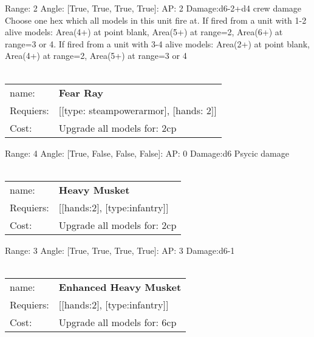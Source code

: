 Range: 2  Angle: [True, True, True, True]: AP: 2 Damage:d6-2+d4 crew damage \\
Choose one hex which all models in this unit fire at. If fired from a unit with 1-2 alive models: Area(4+) at point blank, Area(5+) at range=2, Area(6+) at range=3 or 4. If fired from a unit with 3-4 alive models: Area(2+) at point blank, Area(4+) at range=2, Area(5+) at range=3 or 4\\ 








\ \\
\begin{tabular}{ll}
name: & {\bf Fear Ray } \\
Requiers: & [[type: steampowerarmor], [hands: 2]] \\
Cost: & Upgrade all models for: 2cp \\
\end{tabular}



Range: 4  Angle: [True, False, False, False]: AP: 0 Damage:d6 Psycic damage \\








\ \\
\begin{tabular}{ll}
name: & {\bf Heavy Musket } \\
Requiers: & [[hands:2], [type:infantry]] \\
Cost: & Upgrade all models for: 2cp \\
\end{tabular}



Range: 3  Angle: [True, True, True, True]: AP: 3 Damage:d6-1 \\








\ \\
\begin{tabular}{ll}
name: & {\bf Enhanced Heavy Musket } \\
Requiers: & [[hands:2], [type:infantry]] \\
Cost: & Upgrade all models for: 6cp \\
\end{tabular}



